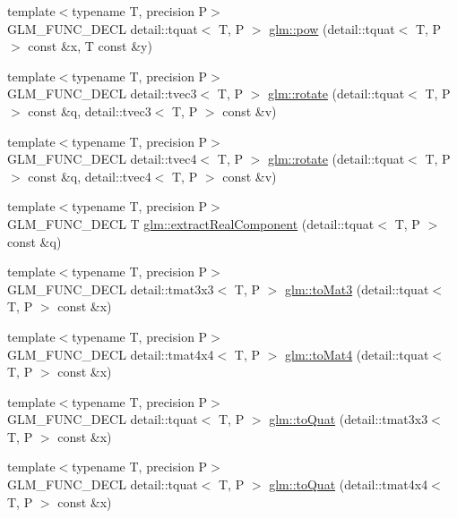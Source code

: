 \begin{CompactItemize}
\item 
{\footnotesize template$<$typename T, precision P$>$ }\\GLM\_\-FUNC\_\-DECL detail::tquat$<$ T, P $>$ \hyperlink{group__gtx__quaternion_g49e7cd8958d474290778760d171a44d2}{glm::pow} (detail::tquat$<$ T, P $>$ const \&x, T const \&y)
\item 
{\footnotesize template$<$typename T, precision P$>$ }\\GLM\_\-FUNC\_\-DECL detail::tvec3$<$ T, P $>$ \hyperlink{group__gtx__quaternion_g3b9f985e75b852e9526d5c088a50c3d4}{glm::rotate} (detail::tquat$<$ T, P $>$ const \&q, detail::tvec3$<$ T, P $>$ const \&v)
\item 
{\footnotesize template$<$typename T, precision P$>$ }\\GLM\_\-FUNC\_\-DECL detail::tvec4$<$ T, P $>$ \hyperlink{group__gtx__quaternion_g9fd82cf89bc167ca12752f03a99329a4}{glm::rotate} (detail::tquat$<$ T, P $>$ const \&q, detail::tvec4$<$ T, P $>$ const \&v)
\item 
{\footnotesize template$<$typename T, precision P$>$ }\\GLM\_\-FUNC\_\-DECL T \hyperlink{group__gtx__quaternion_g1185beb6d3dd4bcf64ea30f5f12a7368}{glm::extractRealComponent} (detail::tquat$<$ T, P $>$ const \&q)
\item 
{\footnotesize template$<$typename T, precision P$>$ }\\GLM\_\-FUNC\_\-DECL detail::tmat3x3$<$ T, P $>$ \hyperlink{group__gtx__quaternion_gdff49fcff8a70186d2fe32117cb565e0}{glm::toMat3} (detail::tquat$<$ T, P $>$ const \&x)
\item 
{\footnotesize template$<$typename T, precision P$>$ }\\GLM\_\-FUNC\_\-DECL detail::tmat4x4$<$ T, P $>$ \hyperlink{group__gtx__quaternion_g79cbd9f8eecf24a7b9f23e4de5fcec29}{glm::toMat4} (detail::tquat$<$ T, P $>$ const \&x)
\item 
{\footnotesize template$<$typename T, precision P$>$ }\\GLM\_\-FUNC\_\-DECL detail::tquat$<$ T, P $>$ \hyperlink{group__gtx__quaternion_gdc8d8daae2f8d725dae576d6655e36d2}{glm::toQuat} (detail::tmat3x3$<$ T, P $>$ const \&x)
\item 
{\footnotesize template$<$typename T, precision P$>$ }\\GLM\_\-FUNC\_\-DECL detail::tquat$<$ T, P $>$ \hyperlink{group__gtx__quaternion_g1d496c7c0d0b1a2edc5bb4c2ffcbc6e7}{glm::toQuat} (detail::tmat4x4$<$ T, P $>$ const \&x)
\item 

\end{CompactItemize}

